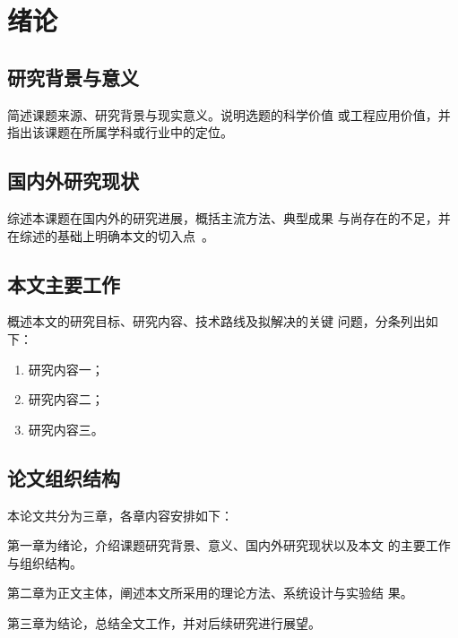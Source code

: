\chapter{绪论}
\label{chap:intro}

\section{研究背景与意义}
\hspace{2em}简述课题来源、研究背景与现实意义。说明选题的科学价值
或工程应用价值，并指出该课题在所属学科或行业中的定位。

\section{国内外研究现状}
\hspace{2em}综述本课题在国内外的研究进展，概括主流方法、典型成果
与尚存在的不足，并在综述的基础上明确本文的切入点~\cite{example1}。

\section{本文主要工作}
\hspace{2em}概述本文的研究目标、研究内容、技术路线及拟解决的关键
问题，分条列出如下：
\begin{enumerate}
\item 研究内容一；
\item 研究内容二；
\item 研究内容三。
\end{enumerate}

\section{论文组织结构}
\hspace{2em}本论文共分为三章，各章内容安排如下：

第一章为绪论，介绍课题研究背景、意义、国内外研究现状以及本文
的主要工作与组织结构。

第二章为正文主体，阐述本文所采用的理论方法、系统设计与实验结
果。

第三章为结论，总结全文工作，并对后续研究进行展望。

